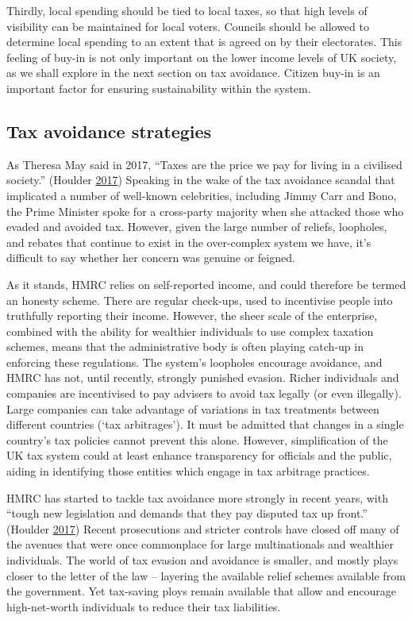 \documentclass[]{tufte-handout}
\begin{document}
Thirdly, local spending should be tied to local taxes, so that high
levels of visibility can be maintained for local voters. Councils should
be allowed to determine local spending to an extent that is agreed on by
their electorates. This feeling of buy-in is not only important on the
lower income levels of UK society, as we shall explore in the next
section on tax avoidance. Citizen buy-in is an important factor for
ensuring sustainability within the system.

\hypertarget{tax-avoidance-strategies}{%
\subsection{Tax avoidance strategies}\label{tax-avoidance-strategies}}

As Theresa May said in 2017, ``Taxes are the price we pay for living in
a civilised society.'' (Houlder
\protect\hyperlink{ref-Houlder2017}{2017}) Speaking in the wake of the
tax avoidance scandal that implicated a number of well-known
celebrities, including Jimmy Carr and Bono, the Prime Minister spoke for
a cross-party majority when she attacked those who evaded and avoided
tax. However, given the large number of reliefs, loopholes, and rebates
that continue to exist in the over-complex system we have, it's
difficult to say whether her concern was genuine or feigned.

As it stands, HMRC relies on self-reported income, and could therefore
be termed an honesty scheme. There are regular check-ups, used to
incentivise people into truthfully reporting their income. However, the
sheer scale of the enterprise, combined with the ability for wealthier
individuals to use complex taxation schemes, means that the
administrative body is often playing catch-up in enforcing these
regulations. The system's loopholes encourage avoidance, and HMRC has
not, until recently, strongly punished evasion. Richer individuals and
companies are incentivised to pay advisers to avoid tax legally (or even
illegally). Large companies can take advantage of variations in tax
treatments between different countries (`tax arbitrages'). It must be
admitted that changes in a single country's tax policies cannot prevent
this alone. However, simplification of the UK tax system could at least
enhance transparency for officials and the public, aiding in identifying
those entities which engage in tax arbitrage practices.

HMRC has started to tackle tax avoidance more strongly in recent years,
with ``tough new legislation and demands that they pay disputed tax up
front.'' (Houlder \protect\hyperlink{ref-Houlder2017}{2017}) Recent
prosecutions and stricter controls have closed off many of the avenues
that were once commonplace for large multinationals and wealthier
individuals. The world of tax evasion and avoidance is smaller, and
mostly plays closer to the letter of the law -- layering the available
relief schemes available from the government. Yet tax-saving ploys
remain available that allow and encourage high-net-worth individuals to
reduce their tax liabilities.
\end{document}
